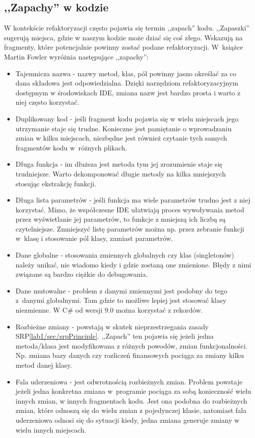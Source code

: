 \subsection{,,Zapachy'' w kodzie}
W kontekście refaktoryzacji często pojawia się termin ,,zapach'' kodu. ,,Zapaszki'' sugerują miejsca, gdzie w naszym kodzie może dziać się coś złego. Wskazują na fragmenty, które potencjalnie powinny zostać podane refaktoryzacji. W~książce\cite{refaktoryzacja_fowler} Martin Fowler wyróżnia następujące ,,zapachy'':
\begin{itemize}
	\item Tajemnicza nazwa - nazwy metod, klas, pól powinny jasno określać za co dana składowa jest odpowiedzialna. Dzięki narzędziom refaktoryzacyjnym dostępnym w środowiskach IDE, zmiana nazw jest bardzo prosta i warto z niej często korzystać.
	\item Duplikowany kod - jeśli fragment kodu pojawia się w wielu miejscach jego utrzymanie staje się trudne. Konieczne jest pamiętanie o wprowadzaniu zmian w kilku miejscach, niezbędne jest również czytanie tych samych fragmentów kodu w~różnych plikach.
	\item Długa funkcja - im dłuższa jest metoda tym jej zrozumienie staje się trudniejsze. Warto dekomponować długie metody na kilka mniejszych stosując ekstrakcję funkcji.
	\item Długa lista parametrów - jeśli funkcja ma wiele parametrów trudno jest z niej korzystać. Mimo, że współczesne IDE ułatwiają proces wywoływania metod przez wyświetlanie jej parametrów, to funkcje z mniejszą ich liczbą są czytelniejsze. Zmniejszyć listę parametrów można np. przez zebranie funkcji w~klasę i stosowanie pól klasy, zamiast parametrów. 
	\item Dane globalne - stosowania zmiennych globalnych czy klas (singletonów) należy unikać, nie wiadomo kiedy i gdzie zostaną one zmienione. Błędy z nimi związane są bardzo ciężkie do debugowania. 
	\item Dane mutowalne - problem z danymi zmiennymi jest podobny do tego z~danymi globalnymi. Tam gdzie to możliwe lepiej jest stosować klasy niezmienne. W C\# od wersji 9.0 można korzystać z rekordów.
	\item Rozbieżne zmiany - powstają w skutek nieprzestrzegania zasady SRP\ref{lab1/sec/srpPrinciple}. ,,Zapach'' ten pojawia się jeżeli jedna metoda/klasa jest modyfikowana z różnych powodów, zmian funkcjonalności. Np. zmiana bazy danych czy rozliczeń finansowych pociąga za zmiany kilku metod danej klasy.
	\item Fala uderzeniowa - jest odwrotnością rozbieżnych zmian. Problem powstaje jeżeli jedna konkretna zmiana w~programie pociąga za sobą konieczność wielu innych zmian, w innych fragmentach kodu. Jest ona podobna do rozbieżnych zmian, które odnoszą się do wielu zmian z pojedynczej klasie, natomiast fala uderzeniowa odnosi się do sytuacji kiedy, jedna zmiana generuje zmiany w wielu innych miejscach.

\end{itemize}
